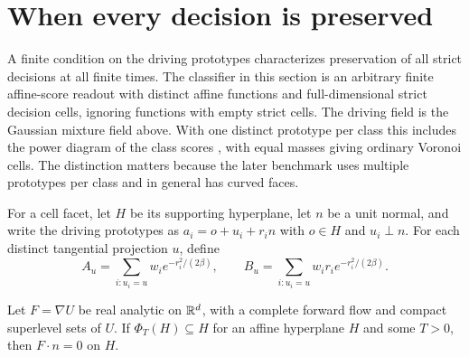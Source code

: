 \section{When every decision is preserved}
\label{sec:flat}

A finite condition on the driving prototypes characterizes preservation
of all strict decisions at all finite times. The classifier in this section
is an arbitrary finite affine-score readout with distinct affine functions
and full-dimensional strict decision cells, ignoring functions with empty
strict cells. The driving field is the Gaussian mixture field above.
With one distinct prototype per class this includes the power diagram
of the class scores \cite{aurenhammer}, with equal masses giving ordinary
Voronoi cells. The distinction matters because the later benchmark uses
multiple prototypes per class and in general has curved faces.

For a cell facet, let $H$ be its supporting hyperplane, let $n$ be a
unit normal, and write the driving prototypes as $a_i=o+u_i+r_i n$
with $o\in H$ and $u_i\perp n$. For each distinct tangential projection
$u$, define
\begin{equation}
 A_u=\sum_{i:u_i=u}w_i e^{-r_i^2/(2\beta)},\qquad
 B_u=\sum_{i:u_i=u}w_i r_i e^{-r_i^2/(2\beta)}.
 \label{eq:fiber}
\end{equation}

\begin{lemma}
\label{lem:sampled-tangency}
Let $F=\nabla U$ be real analytic on $\mathbb{R}^d$, with a complete forward
flow and compact superlevel sets of $U$. If $\Phi_T(H)\subseteq H$ for
an affine hyperplane $H$ and some $T>0$, then $F\cdot n=0$ on $H$.
\end{lemma}

